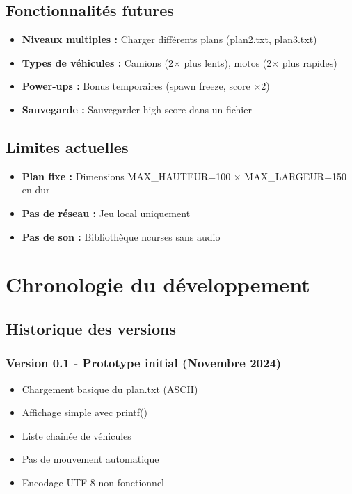 \documentclass[12pt,a4paper]{article}
\begin{document}
\subsection{Fonctionnalités futures}

\begin{itemize}
    \item \textbf{Niveaux multiples :} Charger différents plans (plan2.txt, plan3.txt)
    \item \textbf{Types de véhicules :} Camions (2× plus lents), motos (2× plus rapides)
    \item \textbf{Power-ups :} Bonus temporaires (spawn freeze, score ×2)
    \item \textbf{Sauvegarde :} Sauvegarder high score dans un fichier
\end{itemize}

\subsection{Limites actuelles}

\begin{itemize}
    \item \textbf{Plan fixe :} Dimensions MAX\_HAUTEUR=100 × MAX\_LARGEUR=150 en dur
    \item \textbf{Pas de réseau :} Jeu local uniquement
    \item \textbf{Pas de son :} Bibliothèque ncurses sans audio
\end{itemize}


\section{Chronologie du développement}

\subsection{Historique des versions}

\subsubsection{Version 0.1 - Prototype initial (Novembre 2024)}
\begin{itemize}
    \item[$\checkmark$] Chargement basique du plan.txt (ASCII)
    \item[$\checkmark$] Affichage simple avec printf()
    \item[$\checkmark$] Liste chaînée de véhicules
    \item[$\times$] Pas de mouvement automatique
    \item[$\times$] Encodage UTF-8 non fonctionnel
\end{itemize}
\end{document}
